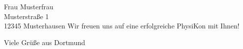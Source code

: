 \documentclass[
  pepbrief,
  fontsize=12pt,
  paper=a4,
  DIV=14,
  parskip=half,
  backaddress=false,
]{scrlttr2}
\begin{document}
\begin{letter}{%
  Frau Musterfrau \\
  Musterstraße 1 \\
  12345 Musterhausen
}
Wir freuen uns auf eine erfolgreiche PhysiKon mit Ihnen!

\closing{Viele Grüße aus Dortmund}

\end{letter}
\end{document}
